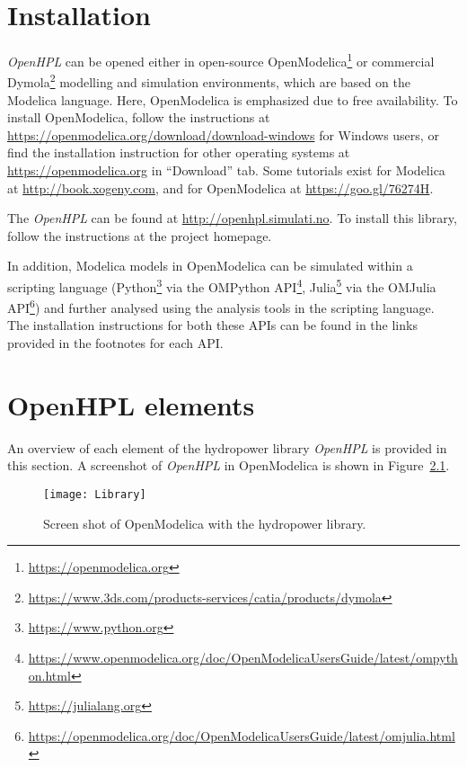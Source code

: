 \documentclass[%
]{USN-PhD}
\begin{document}
\chapter{Installation}

\emph{OpenHPL} can be opened either in open-source OpenModelica\footnote{\url{https://openmodelica.org}} or commercial Dymola\footnote{\url{https://www.3ds.com/products-services/catia/products/dymola}} modelling and simulation environments, which are based on the Modelica language. Here, OpenModelica is emphasized due to free availability. To install OpenModelica, follow the instructions at \url{https://openmodelica.org/download/download-windows} for Windows users, or find the installation instruction for other operating systems at \url{https://openmodelica.org} in ``Download'' tab. Some tutorials exist for Modelica at \url{http://book.xogeny.com}, and for OpenModelica at \url{https://goo.gl/76274H}.

The \emph{OpenHPL} can be found at \url{http://openhpl.simulati.no}. To install this library, follow the instructions at the project homepage.

In addition, Modelica models in OpenModelica can be simulated within a scripting language (Python\footnote{\url{https://www.python.org}} via the OMPython API\footnote{\url{https://www.openmodelica.org/doc/OpenModelicaUsersGuide/latest/ompython.html}}, Julia\footnote{\url{https://julialang.org}} via the OMJulia API\footnote{\url{https://openmodelica.org/doc/OpenModelicaUsersGuide/latest/omjulia.html}}) and further analysed using the analysis tools in the scripting language. The installation instructions for both these APIs can be found in the links provided in the footnotes for each API.

\chapter{OpenHPL elements}

An overview of each element of the hydropower library \emph{OpenHPL} is provided in this section. A screenshot of \emph{OpenHPL} in OpenModelica is shown in Figure~\ref{fig:Library}.

\begin{figure}[!ht]
  \centering
 \texttt{[image: Library]}
 \caption{Screen shot of OpenModelica with the hydropower library.}
  \label{fig:Library}
\end{figure}
\end{document}
